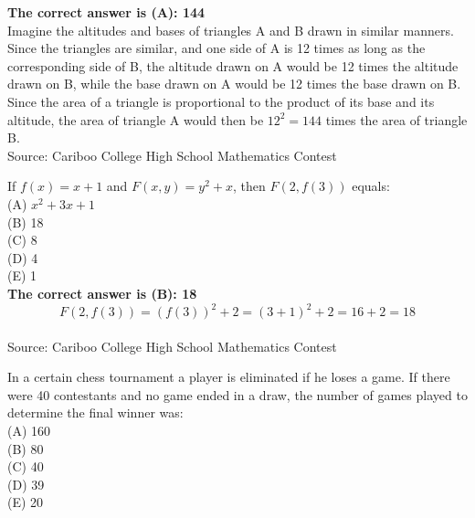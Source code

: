 \documentclass{article}
\begin{document}
\textbf{The correct answer is (A): 144}\\[1ex]
Imagine the altitudes and bases of triangles A and B drawn in similar manners. Since the triangles are similar, and one side of A is 12 times as long as the corresponding side of B, the altitude drawn on A would be 12 times the altitude drawn on B, while the base drawn on A would be 12 times the base drawn on B. Since the area of a triangle is proportional to the product of its base and its altitude, the area of triangle A would then be $12^{2}=144$ times the area of triangle B.
\\[5 ex]

\scriptsize
Source: Cariboo College High School Mathematics Contest

\normalsize
If $f(x)=x+1$ and $F(x,y)=y^{2}+x$, then $F(2,f(3))$ equals:\\
(A) $x^{2}+3x+1$\\
(B) 18\\
(C) 8\\
(D) 4\\
(E) 1\\


\textbf{The correct answer is (B): 18}\\[1 ex]
\begin{equation*} 
F(2,f(3))=(f(3))^{2}+2=(3+1)^{2}+2=16+2=18
\end{equation*}
\\[5 ex]

\scriptsize
Source: Cariboo College High School Mathematics Contest

\normalsize
In a certain chess tournament a player is eliminated if he loses a game. If there were 40 contestants and no game ended in a draw, the number of games played to determine the final winner was:\\
(A) 160\\
(B) 80\\
(C) 40\\
(D) 39\\
(E) 20\\
\end{document}
